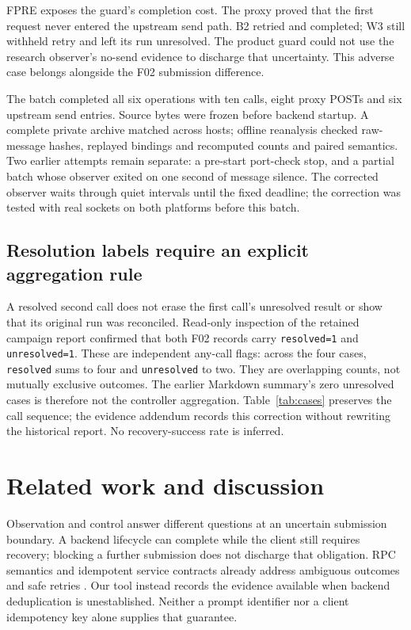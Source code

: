 \documentclass[conference,letterpaper,10pt]{IEEEtran}
\begin{document}
FPRE exposes the guard's completion cost. The proxy proved that the first
request never entered the upstream send path. B2 retried and completed; W3
still withheld retry and left its run unresolved. The product guard could not
use the research observer's no-send evidence to discharge that uncertainty.
This adverse case belongs alongside the F02 submission difference.

The batch completed all six operations with ten calls, eight proxy POSTs and
six upstream send entries. Source bytes were frozen before backend startup.
A complete private archive matched across hosts; offline reanalysis checked
raw-message hashes, replayed bindings and recomputed counts and paired semantics.
Two earlier attempts remain separate: a pre-start port-check stop, and a partial
batch whose observer exited on one second of message silence. The corrected
observer waits through quiet intervals until the fixed deadline; the correction
was tested with real sockets on both platforms before this batch.

\subsection{Resolution labels require an explicit aggregation rule}

A resolved second call does not erase the first call's unresolved result or
show that its original run was reconciled. Read-only inspection of the retained
campaign report confirmed that both F02 records carry \texttt{resolved=1} and
\texttt{unresolved=1}. These are independent any-call flags: across the four cases,
\texttt{resolved} sums to four and \texttt{unresolved} to two. They are overlapping counts,
not mutually exclusive outcomes. The earlier Markdown summary's zero unresolved
cases is therefore not the controller aggregation. Table~\ref{tab:cases} preserves the call
sequence; the evidence addendum records this correction without rewriting the
historical report. No recovery-success rate is inferred.

\section{Related work and discussion}
\label{sec:related}

Observation and control answer different questions at an uncertain submission
boundary. A backend lifecycle can complete while the client still requires
recovery; blocking a further submission does not discharge that obligation.
RPC semantics and idempotent service contracts already address ambiguous
outcomes and safe retries \cite{birrell1984,aws}. Our tool instead records the
evidence available when backend deduplication is unestablished. Neither a
prompt identifier nor a client idempotency key alone supplies that guarantee.
\end{document}
